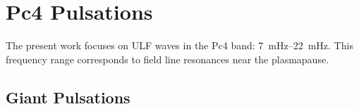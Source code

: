 \section{Pc4 Pulsations}

The present work focuses on ULF waves in the Pc4 band: \SIrange{7}{22}{\mHz}. This frequency range corresponds to field line resonances near the plasmapause. 






\subsection{Giant Pulsations}


%
%





